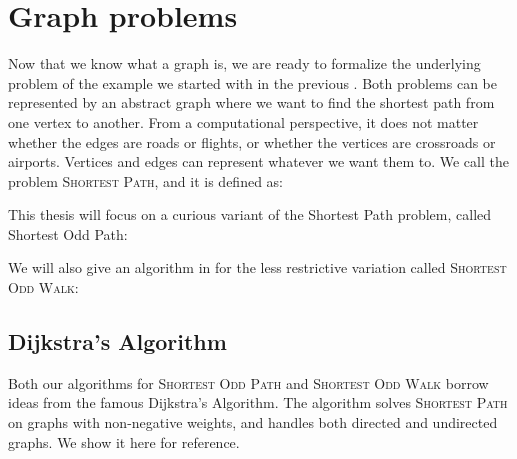 \section{Graph problems}
\label{section:graph-problems}

Now that we know what a graph is, we are ready to formalize the underlying problem of the example we started with in the previous . Both problems can be represented by an abstract graph where we want to find the shortest path from one vertex to another. From a computational perspective, it does not matter whether the edges are roads or flights, or whether the vertices are crossroads or airports. Vertices and edges can represent whatever we want them to. We call the problem \textsc{Shortest Path}, and it is defined as:

\noindent{}

This thesis will focus on a curious variant of the Shortest Path problem, called Shortest Odd Path:

\noindent{}

We will also give an algorithm in  for the less restrictive variation called \textsc{Shortest Odd Walk}:

\noindent{}

\subsection*{Dijkstra's Algorithm}
\label{algorithm:dijkstras-algorithm}
Both our algorithms for \textsc{Shortest Odd Path} and \textsc{Shortest Odd Walk} borrow ideas from the famous Dijkstra's Algorithm. The algorithm solves \textsc{Shortest Path} on graphs with non-negative weights, and handles both directed and undirected graphs. We show it here for reference.

